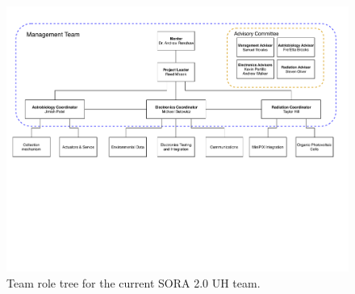 \begin{figure}[!h]
  \begin{center}
    \includegraphics[width=1\textwidth]{./Figures/TeamRoleTree.pdf}
    \caption{Team role tree for the current SORA 2.0 UH team.}
    \label{fig:Roles} 
  \end{center}
\end{figure}

